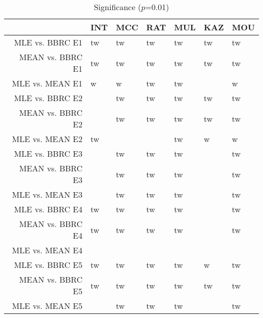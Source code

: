 \begin{table}[t]
\begin{center}
\begin{tabular}{rllllll}
  \hline
 & INT & MCC & RAT & MUL & KAZ & MOU \\ 
  \hline
MLE vs. BBRC E1 & tw & tw & tw & tw & tw & tw \\ 
  MEAN vs. BBRC E1 & tw & tw & tw & tw & tw & tw \\ 
  MLE vs. MEAN E1 & w & w & tw & tw &  & w \\ 
  MLE vs. BBRC E2 &  & tw & tw & tw & tw & tw \\ 
  MEAN vs. BBRC E2 &  & tw & tw & tw & tw & tw \\ 
  MLE vs. MEAN E2 & tw &  &  & tw & w & w \\ 
  MLE vs. BBRC E3 &  & tw & tw & tw &  & tw \\ 
  MEAN vs. BBRC E3 &  & tw & tw & tw &  & tw \\ 
  MLE vs. MEAN E3 &  & tw & tw & tw &  & tw \\ 
  MLE vs. BBRC E4 & tw & tw & tw & tw &  & tw \\ 
  MEAN vs. BBRC E4 & tw & tw & tw & tw &  & tw \\ 
  MLE vs. MEAN E4 &  &  &  &  &  &  \\ 
  MLE vs. BBRC E5 & tw & tw & tw & tw & w & tw \\ 
  MEAN vs. BBRC E5 & tw & tw & tw & tw & tw & tw \\ 
  MLE vs. MEAN E5 &  & tw & tw & tw &  & tw \\ 
   \hline
\end{tabular}
\caption{Significance ($p$=0.01)}
\label{t:sign}
\end{center}
\end{table}
